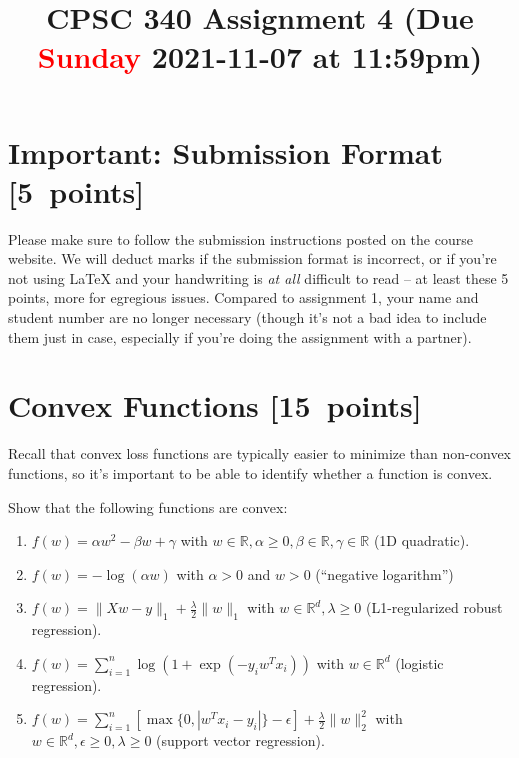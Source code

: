 \documentclass{article}
\newcommand{\blu}[1]{{\textcolor{blu}{#1}}}
\newcommand{\red}[1]{\textcolor{red}{#1}}
\let\ask\blu
\newcommand\pts[1]{\textcolor{pointscolour}{[#1~points]}}
\def\R{\mathbb{R}}
\newcommand{\norm}[1]{\lVert #1 \rVert}
\begin{document}
\title{CPSC 340 Assignment 4 (Due \red{Sunday} 2021-11-07 at 11:59pm)}
\date{}
\maketitle

\vspace{-4em}


\section*{Important: Submission Format \pts{5}}

    Please make sure to follow the submission instructions posted on the course website.
    \ask{We will deduct marks if the submission format is incorrect, or if you're not using \LaTeX{} and your handwriting is \emph{at all} difficult to read} -- at least these 5 points, more for egregious issues.
    Compared to assignment 1, your name and student number are no longer necessary (though it's not a bad idea to include them just in case, especially if you're doing the assignment with a partner).

\section{Convex Functions \pts{15}}

Recall that convex loss functions are typically easier to minimize than non-convex functions, so it's important to be able to identify whether a function is convex.

\ask{Show that the following functions are convex}:

\begin{enumerate}
\item $f(w) = \alpha w^2 - \beta w + \gamma$ with $w \in \R, \alpha \geq 0, \beta \in \R, \gamma \in \R$ (1D quadratic).

\item $f(w) = -\log(\alpha w) $ with $\alpha > 0$ and $w > 0$ (``negative logarithm'')

\item $f(w) = \norm{Xw-y}_1 + \frac{\lambda}{2}\norm{w}_1$ with $w \in \R^d, \lambda \geq 0$ (L1-regularized robust regression).

\item $f(w) = \sum_{i=1}^n \log(1+\exp(-y_iw^Tx_i)) $ with $w \in \R^d$ (logistic regression).

\item $f(w) = \sum_{i=1}^n[\max\{0,|w^Tx_i - y_i|\} - \epsilon] + \frac{\lambda}{2}\norm{w}_2^2$  with $w \in \R^d, \epsilon \geq 0, \lambda \geq 0$ (support vector regression).
\end{enumerate}
\end{document}
